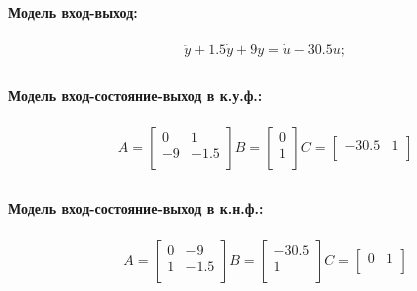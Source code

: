 \paragraph{Модель вход-выход:}

\begin{equation}
	\begin{split}	
&\ddot{y} + 1.5\dot{y} + 9y = \dot{u} - 30.5u;\\
	\end{split}
\end{equation}

\paragraph{Модель вход-состояние-выход в к.у.ф.:}
\begin{equation}
	\begin{split}
		&A=\begin{bmatrix}
		0 & 1\\
		-9 & -1.5\\
		\end{bmatrix} B=\begin{bmatrix}
		0\\
		1\\
		\end{bmatrix} C=\begin{bmatrix}
		-30.5 & 1\\
		\end{bmatrix}\\
	\end{split}
\end{equation}
\paragraph{Модель вход-состояние-выход в к.н.ф.:}
\begin{equation}
	\begin{split}
		&A=\begin{bmatrix}
		0 & -9\\
		1 & -1.5\\
		\end{bmatrix} B=\begin{bmatrix}
		-30.5\\
		1\\
		\end{bmatrix} C=\begin{bmatrix}
		0 & 1\\
		\end{bmatrix}\\
	\end{split}
\end{equation}
